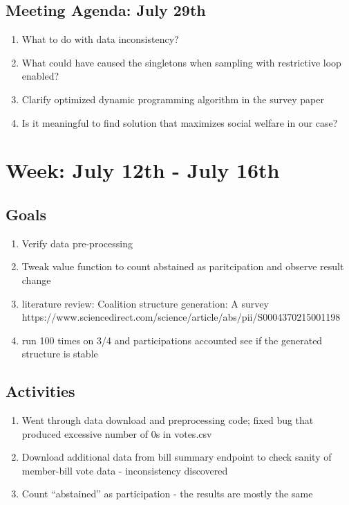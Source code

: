 \documentclass[a4paper]{article}
\begin{document}
\subsection*{Meeting Agenda: July 29th}

\begin{enumerate}
  \item What to do with data inconsistency?
  \item What could have caused the singletons when sampling with restrictive loop enabled?
  \item Clarify optimized dynamic programming algorithm in the survey paper
  \item Is it meaningful to find solution that maximizes social welfare in our case?
\end{enumerate}

\section*{Week: July 12th - July 16th}

\subsection*{Goals}

\begin{enumerate}
  \item Verify data pre-processing
  \item Tweak value function to count abstained as paritcipation and observe result change
  \item literature review: Coalition structure generation: A survey https://www.sciencedirect.com/science/article/abs/pii/S0004370215001198
  \item run 100 times on 3/4 and participations accounted see if the generated structure is stable
\end{enumerate}

\subsection*{Activities}

\begin{enumerate}
  \item Went through data download and preprocessing code; fixed bug that produced excessive number of 0s in votes.csv
  \item Download additional data from bill summary endpoint to check sanity of member-bill vote data - inconsistency discovered
  \item Count ``abstained'' as participation - the results are mostly the same
\end{enumerate}
\end{document}
